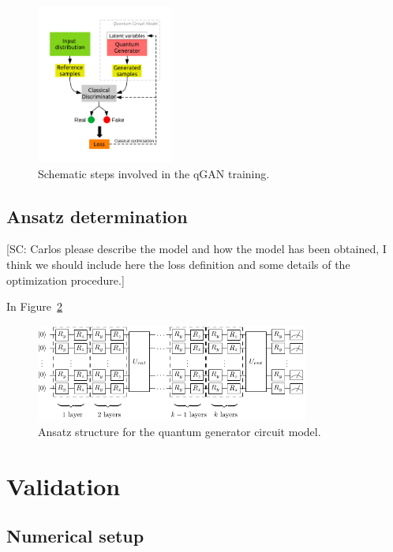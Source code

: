 \documentclass[twocolumn,preprintnumbers,superscriptaddress]{revtex4-2}
\begin{document}
\begin{figure}
  \includegraphics[width=0.4\textwidth]{plots/scheme.pdf}
  \caption{\label{fig:scheme} Schematic steps involved in the qGAN training.}
\end{figure}

\subsection{Ansatz determination}

{\color{red}[SC: Carlos please describe the model and how the model has been obtained, I think we should include here the loss definition and some details of the optimization procedure.]}

In Figure~\ref{fig:circuit}

\begin{figure}
  \includegraphics[width=0.8\textwidth]{plots/ansatz1.pdf}
  \caption{\label{fig:circuit}Ansatz structure for the quantum generator circuit model.}
\end{figure}

\section{Validation}
\label{sec:validation}

\subsection{Numerical setup}
\end{document}
